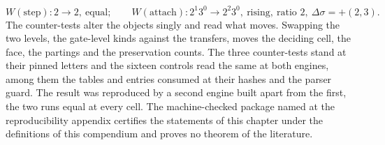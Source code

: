 \begin{chproof}[census]
\begin{equation} W(\text{step}) : 2 \to 2, \ \text{equal}; \qquad W(\text{attach}) : 2^{1}3^{0} \to 2^{2}3^{0}, \ \text{rising}, \ \text{ratio } 2, \ \Delta\sigma = +(2,3) . \end{equation}
The counter-tests alter the objects singly and read what moves. Swapping the two levels, the gate-level kinds against the transfers, moves the deciding cell, the face, the partings and the preservation counts. The three counter-tests stand at their pinned letters and the sixteen controls read the same at both engines, among them the tables and entries consumed at their hashes and the parser guard. The result was reproduced by a second engine built apart from the first, the two runs equal at every cell.
The machine-checked package named at the reproducibility appendix certifies the statements of this chapter under the definitions of this compendium and proves no theorem of the literature.
\end{chproof}
\par\medskip{}\label{narr:close:3-7}\par
